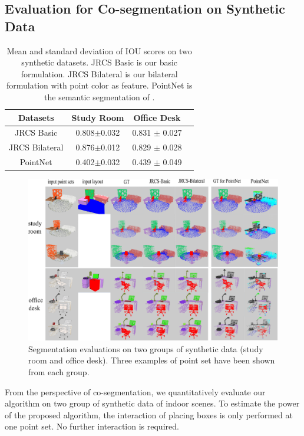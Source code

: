 \subsection{Evaluation for Co-segmentation on Synthetic Data}
\begin{table}
	\centering
	\caption{Mean and standard deviation of IOU scores on two synthetic datasets. JRCS Basic is our basic formulation. JRCS Bilateral  is our bilateral formulation with point color as feature. PointNet is the semantic segmentation of \cite{qi2016pointnet}. }
	\begin{tabular}{c c c c}
		Datasets &  Study Room & Office Desk \\
		\hline
		JRCS Basic & 0.808$\pm$0.032 & 0.831 $\pm$ 0.027\\   
		JRCS Bilateral & 0.876$\pm$0.012 & 0.829 $\pm$ 0.028\\
		PointNet & 0.402$\pm$0.032 &  0.439 $\pm$ 0.049\\
	\end{tabular}
	\label{tab:seg}
\end{table}
\begin{figure}[htb]
	\centering
	\includegraphics[width=\linewidth]{images/exp/exp_seg}
	\caption{\label{fig:seg} Segmentation evaluations on two groups of synthetic data (study room and office desk). Three examples of point set have been shown from each group.}
\end{figure}
%
From the perspective of co-segmentation, we quantitatively evaluate our algorithm on two group of synthetic data of indoor scenes. 
%
To estimate the power of the proposed algorithm, the interaction of placing boxes is only performed at one point set. No further interaction is required. 
